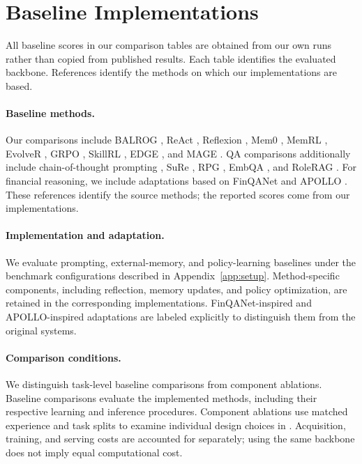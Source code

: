 \section{Baseline Implementations}
\label{app:published}

All baseline scores in our comparison tables are obtained
from our own runs rather than copied from published results.
Each table identifies the evaluated backbone. References
identify the methods on which our implementations are based.

\paragraph{Baseline methods.}
Our comparisons include BALROG
\citep{balrog2026leaderboard},
ReAct \citep{yao2023react},
Reflexion \citep{shinn2023reflexion},
Mem0 \citep{chhikara2025mem0},
MemRL \citep{memrl2026},
EvolveR \citep{evolver2025},
GRPO \citep{shao2024deepseekmath},
SkillRL \citep{skillrl2026},
EDGE \citep{xie2026edge},
and MAGE \citep{yang2026mage}.
QA comparisons additionally include chain-of-thought
prompting \citep{wei2022chain},
SuRe \citep{kim2024sure},
RPG \citep{lyu2024retrieve},
EmbQA \citep{hu-etal-2025-beyond},
and RoleRAG \citep{zhu-etal-2025-single}.
For financial reasoning, we include adaptations based on
FinQANet \citep{chen2021finqa}
and APOLLO \citep{sun2024apollo}.
These references identify the source methods;
the reported scores come from our implementations.


\paragraph{Implementation and adaptation.}
We evaluate prompting, external-memory, and policy-learning
baselines under the benchmark configurations described in
Appendix~\ref{app:setup}. Method-specific components, including
reflection, memory updates, and policy optimization, are
retained in the corresponding implementations.
FinQANet-inspired and APOLLO-inspired adaptations are labeled
explicitly to distinguish them from the original systems.

\paragraph{Comparison conditions.}
We distinguish task-level baseline comparisons from
component ablations. Baseline comparisons evaluate the
implemented methods, including their respective learning
and inference procedures. Component ablations use matched
experience and task splits to examine individual design
choices in \method. Acquisition, training, and serving costs
are accounted for separately; using the same backbone does
not imply equal computational cost.